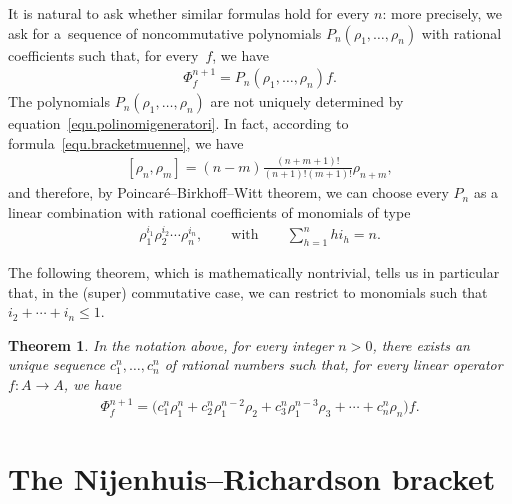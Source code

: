 \documentclass[11pt]{article}
\numberwithin{equation}{section}
\newtheorem{Theorem}{Theorem}[section]
\begin{document}
It is natural to ask whether similar formulas hold for every $n$: more precisely, we ask for a~sequence of noncommutative polynomials $P_n(\rho_1,\ldots,\rho_n)$ with rational coef\/f\/icients such that, for every~$f$, we have
\begin{gather}\label{equ.polinomigeneratori}
 \Phi_f^{n+1}=P_n(\rho_1,\ldots,\rho_n)f .
 \end{gather}
\setcounter{section}{2}
\setcounter{subsection}{0}
\setcounter{subsubsection}{0}
\setcounter{Theorem}{2}
\setcounter{equation}{3}
The polynomials $P_n(\rho_1,\ldots,\rho_n)$ are not uniquely determined by equation~\eqref{equ.polinomigeneratori}. In fact, according to formula~\eqref{equ.bracketmuenne}, we have
\begin{gather}\label{equ.bracketrhoenne}
[\rho_n,\rho_m]=(n-m)\frac{(n+m+1)!}{(n+1)!(m+1)!}\rho_{n+m},\end{gather}
and therefore, by Poincar\'e--Birkhof\/f--Witt theorem, we can choose every $P_n$ as a linear combination with rational coef\/f\/icients of monomials of type
\begin{gather*} \rho_1^{i_1}\rho_2^{i_2}\cdots \rho_n^{i_n},\qquad \text{with}\qquad\sum_{h=1}^n hi_h=n .\end{gather*}

The following theorem, which is mathematically nontrivial, tells us in particular that, in the (super) commutative case, we can restrict to monomials such that $i_2+\cdots+i_n\le 1$.

\begin{Theorem}\label{thm.standardform}
In the notation above, for every integer $n>0$, there exists an unique sequence
$c_1^n,\ldots,c_n^n$ of rational numbers
such that, for every linear operator $f\colon A\to A$, we have
\begin{gather*}\Phi^{n+1}_f=\big(c_1^n\rho_1^n+c^n_2\rho_1^{n-2}\rho_2+c^n_3\rho_1^{n-3}\rho_3+\cdots+c^n_n\rho_n\big)f.\end{gather*}
\end{Theorem}
\setcounter{section}{2}
\setcounter{subsection}{0}
\setcounter{subsubsection}{0}
\setcounter{Theorem}{4}
\setcounter{equation}{4}
\section{The Nijenhuis--Richardson bracket}\label{sec.NR}
\end{document}
